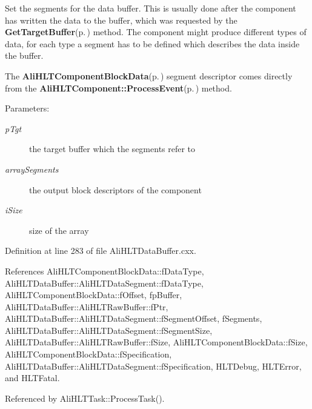 Set the segments for the data buffer. This is usually done after the component has written the data to the buffer, which was requested by the {\bf Get\-Target\-Buffer}{\rm (p.\,\pageref{classAliHLTDataBuffer_a8})} method. The component might produce different types of data, for each type a segment has to be defined which describes the data inside the buffer.\par
 The {\bf Ali\-HLTComponent\-Block\-Data}{\rm (p.\,\pageref{structAliHLTComponentBlockData})} segment descriptor comes directly from the {\bf Ali\-HLTComponent::Process\-Event}{\rm (p.\,\pageref{classAliHLTComponent_a6})} method. \begin{Desc}
\item[Parameters:]
\begin{description}
\item[{\em p\-Tgt}]the target buffer which the segments refer to \item[{\em array\-Segments}]the output block descriptors of the component \item[{\em i\-Size}]size of the array \end{description}
\end{Desc}


Definition at line 283 of file Ali\-HLTData\-Buffer.cxx.

References Ali\-HLTComponent\-Block\-Data::f\-Data\-Type, Ali\-HLTData\-Buffer::Ali\-HLTData\-Segment::f\-Data\-Type, Ali\-HLTComponent\-Block\-Data::f\-Offset, fp\-Buffer, Ali\-HLTData\-Buffer::Ali\-HLTRaw\-Buffer::f\-Ptr, Ali\-HLTData\-Buffer::Ali\-HLTData\-Segment::f\-Segment\-Offset, f\-Segments, Ali\-HLTData\-Buffer::Ali\-HLTData\-Segment::f\-Segment\-Size, Ali\-HLTData\-Buffer::Ali\-HLTRaw\-Buffer::f\-Size, Ali\-HLTComponent\-Block\-Data::f\-Size, Ali\-HLTComponent\-Block\-Data::f\-Specification, Ali\-HLTData\-Buffer::Ali\-HLTData\-Segment::f\-Specification, HLTDebug, HLTError, and HLTFatal.

Referenced by Ali\-HLTTask::Process\-Task().

